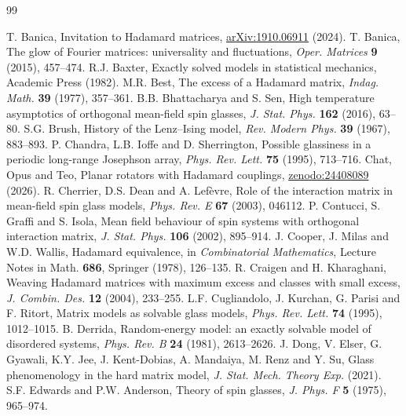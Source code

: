 \documentclass[11pt,a4paper]{article}
\theoremstyle{remark}
\begin{document}
\begin{thebibliography}{99}
\small\setlength{\itemsep}{1pt}\setlength{\parsep}{0pt}
T. Banica, Invitation to Hadamard matrices, {\hypersetup{allcolors=black}\href{https://arxiv.org/pdf/1910.06911}{arXiv:1910.06911}} (2024).
T. Banica, The glow of Fourier matrices: universality and fluctuations, \emph{Oper. Matrices} \textbf{9} (2015), 457--474.
R.J. Baxter, Exactly solved models in statistical mechanics, Academic Press (1982).
M.R. Best, The excess of a Hadamard matrix, \emph{Indag. Math.} \textbf{39} (1977), 357--361.
B.B. Bhattacharya and S. Sen, High temperature asymptotics of orthogonal mean-field spin glasses, \emph{J. Stat. Phys.} \textbf{162} (2016), 63--80.
S.G. Brush, History of the Lenz--Ising model, \emph{Rev. Modern Phys.} \textbf{39} (1967), 883--893.
P. Chandra, L.B. Ioffe and D. Sherrington, Possible glassiness in a periodic long-range Josephson array, \emph{Phys. Rev. Lett.} \textbf{75} (1995), 713--716.
Chat, Opus and Teo, Planar rotators with Hadamard couplings, {\hypersetup{allcolors=black}\href{https://zenodo.org/records/24408089}{zenodo:24408089}} (2026).
R. Cherrier, D.S. Dean and A. Lef\`evre, Role of the interaction matrix in mean-field spin glass models, \emph{Phys. Rev. E} \textbf{67} (2003), 046112.
P. Contucci, S. Graffi and S. Isola, Mean field behaviour of spin systems with orthogonal interaction matrix, \emph{J. Stat. Phys.} \textbf{106} (2002), 895--914.
J. Cooper, J. Milas and W.D. Wallis, Hadamard equivalence, in \emph{Combinatorial Mathematics}, Lecture Notes in Math. \textbf{686}, Springer (1978), 126--135.
R. Craigen and H. Kharaghani, Weaving Hadamard matrices with maximum excess and classes with small excess, \emph{J. Combin. Des.} \textbf{12} (2004), 233--255.
L.F. Cugliandolo, J. Kurchan, G. Parisi and F. Ritort, Matrix models as solvable glass models, \emph{Phys. Rev. Lett.} \textbf{74} (1995), 1012--1015.
B. Derrida, Random-energy model: an exactly solvable model of disordered systems, \emph{Phys. Rev. B} \textbf{24} (1981), 2613--2626.
J. Dong, V. Elser, G. Gyawali, K.Y. Jee, J. Kent-Dobias, A. Mandaiya, M. Renz and Y. Su, Glass phenomenology in the hard matrix model, \emph{J. Stat. Mech. Theory Exp.} (2021).
S.F. Edwards and P.W. Anderson, Theory of spin glasses, \emph{J. Phys. F} \textbf{5} (1975), 965--974.

\end{thebibliography}
\end{document}
